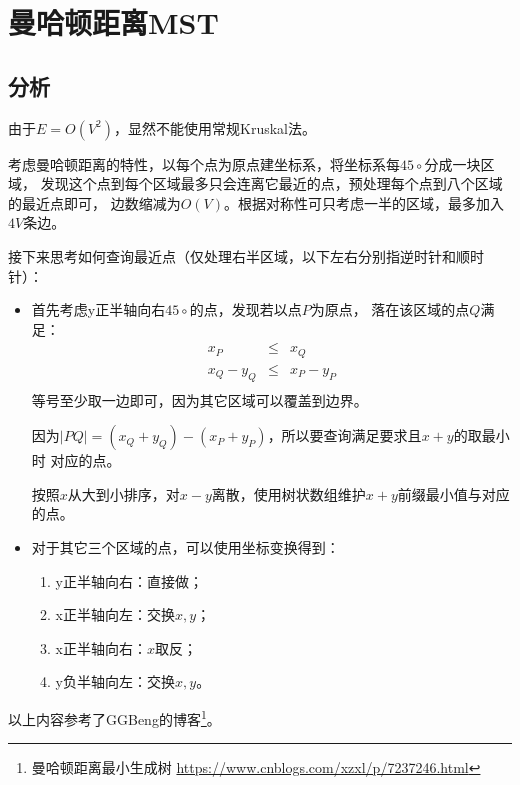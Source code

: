 \section{曼哈顿距离MST}
\subsection{分析}
由于$E=O(V^2)$，显然不能使用常规Kruskal法。

考虑曼哈顿距离的特性，以每个点为原点建坐标系，将坐标系每$45\circ$分成一块区域，
发现这个点到每个区域最多只会连离它最近的点，预处理每个点到八个区域的最近点即可，
边数缩减为$O(V)$。根据对称性可只考虑一半的区域，最多加入$4V$条边。

接下来思考如何查询最近点（仅处理右半区域，以下左右分别指逆时针和顺时针）：

\begin{itemize}
	\item 首先考虑y正半轴向右$45\circ$的点，发现若以点$P$为原点，
	      落在该区域的点$Q$满足：
	      \begin{eqnarray*}
		      x_P&\leq& x_Q\\
		      x_Q-y_Q&\leq& x_P-y_P\\
	      \end{eqnarray*}
	      等号至少取一边即可，因为其它区域可以覆盖到边界。

	      因为$|PQ|=(x_Q+y_Q)-(x_P+y_P)$，所以要查询满足要求且$x+y$的取最小时
	      对应的点。

	      按照$x$从大到小排序，对$x-y$离散，使用树状数组维护$x+y$前缀最小值与对应的点。
	\item 对于其它三个区域的点，可以使用坐标变换得到：
	      \begin{enumerate}
		      \item y正半轴向右：直接做；
		      \item x正半轴向左：交换$x,y$；
		      \item x正半轴向右：$x$取反；
		      \item y负半轴向左：交换$x,y$。
	      \end{enumerate}
\end{itemize}

以上内容参考了GGBeng的博客\footnote{曼哈顿距离最小生成树
	\url{https://www.cnblogs.com/xzxl/p/7237246.html}
}。
